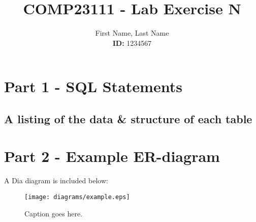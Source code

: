 \documentclass[11pt,a4paper]{article}
\newcommand{\includesqloutput}[1]{\tiny  \normalsize}
\begin{document}
\title{\textbf{COMP23111} - Lab Exercise N}

\author{First Name, Last Name \\ \textbf{ID:} 1234567} 


\maketitle
\thispagestyle{empty} %
\newpage %

\section{Part 1 - SQL Statements}

\subsection{A listing of the data \& structure of each table}

\includesqloutput{sqlOutputs/LabExNOut.lst}

\section{Part 2 - Example ER-diagram}

A Dia diagram is included below:

\begin{figure}[!htbp]      
   	\centering
	\centerline{\texttt{[image: diagrams/example.eps]}}
	\caption{Caption goes here.}
	\label{fig:test-figure}
\end{figure}
\end{document}
